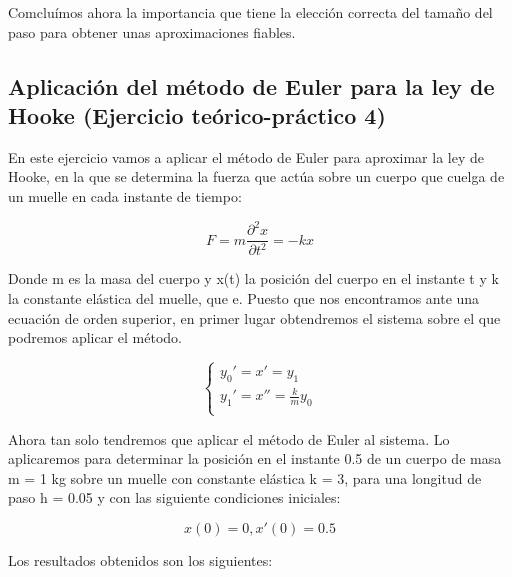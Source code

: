 \documentclass[12pt]{article}       %
\begin{document}
Comcluímos ahora la importancia que tiene la elección correcta del tamaño del paso para obtener unas aproximaciones fiables. 

\subsection{Aplicación del método de Euler para la ley de Hooke (Ejercicio teórico-práctico 4)}
En este ejercicio vamos a aplicar el método de Euler para aproximar la ley de Hooke, en la que se determina la fuerza que actúa sobre un cuerpo que cuelga de un muelle en cada instante de tiempo:

$$ F = m\frac{\partial^2x}{\partial t^2}=-kx$$

Donde m es la masa del cuerpo y x(t) la posición del cuerpo en el instante t y k la constante elástica del muelle, que e. Puesto que nos encontramos ante una ecuación de orden superior, en primer lugar obtendremos el sistema sobre el que podremos aplicar el método.

$$
\begin{cases}
y_0' = x' = y_1\\
y_1' = x'' = \frac{k}{m}y_0\\
\end{cases}
$$

Ahora tan solo tendremos que aplicar el método de Euler al sistema. Lo aplicaremos para determinar la posición en el instante 0.5 de un cuerpo de masa m = 1 kg sobre un muelle con constante elástica  k = 3, para una longitud de paso h = 0.05 y con las siguiente condiciones iniciales:

$$ x(0) = 0, x'(0) = 0.5 $$

Los resultados obtenidos son los siguientes:
\end{document}
